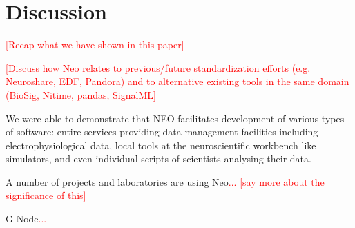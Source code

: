 \documentclass{frontiers}
\newcommand{\missing}[1]{\textcolor{red}{#1}}
\begin{document}
\section{Discussion}


\missing{[Recap what we have shown in this paper]}

\missing{[Discuss how Neo relates to previous/future standardization efforts (e.g. Neuroshare, EDF, Pandora) and to alternative existing tools in the same domain (BioSig, Nitime, pandas, SignalML]}

  


We were able to demonstrate that NEO facilitates development of various types
of software: entire services providing data management facilities including
electrophysiological data, local tools at the neuroscientific workbench like
simulators, and even individual scripts of scientists analysing their data.

A number of projects and laboratories are using Neo\missing{... [say more about the significance of this]}

G-Node\missing{...}
\end{document}
